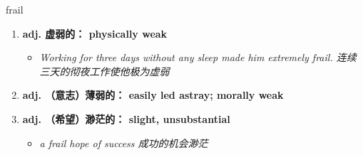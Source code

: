 
\begin{frame}
{\huge frail}
\begin{center}
\begin{enumerate}\Large
  \item \textbf{adj. 虚弱的： physically weak}
  \begin{itemize}
    \item \em{\Large{Working for three days without any sleep made him extremely frail. 连续三天的彻夜工作使他极为虚弱}}
  \end{itemize}
  \item \textbf{adj. （意志）薄弱的： easily led astray; morally weak}
  \item \textbf{adj. （希望）渺茫的： slight, unsubstantial}
  \begin{itemize}
    \item \em{\Large{a frail hope of success 成功的机会渺茫}}
  \end{itemize}
\end{enumerate}
\end{center}
\end{frame}
